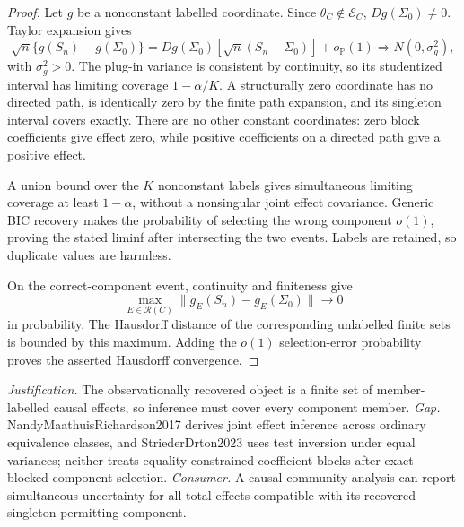 \documentclass{article}
\begin{document}
\begin{proof}
Let \(g\) be a nonconstant labelled coordinate.  Since \(\theta_C\notin\mathcal E_C\), \(Dg(\Sigma_0)\ne0\).  Taylor expansion gives
\[
 \sqrt n\{g(S_n)-g(\Sigma_0)\}
 =Dg(\Sigma_0)[\sqrt n(S_n-\Sigma_0)]+o_{\mathbb P}(1)
 \Longrightarrow N(0,\sigma_g^2),
\]
with \(\sigma_g^2>0\).  The plug-in variance is consistent by continuity, so its studentized interval has limiting coverage \(1-\alpha/K\).  A structurally zero coordinate has no directed path, is identically zero by the finite path expansion, and its singleton interval covers exactly.  There are no other constant coordinates: zero block coefficients give effect zero, while positive coefficients on a directed path give a positive effect.

A union bound over the \(K\) nonconstant labels gives simultaneous limiting coverage at least \(1-\alpha\), without a nonsingular joint effect covariance.  Generic BIC recovery makes the probability of selecting the wrong component \(o(1)\), proving the stated liminf after intersecting the two events.  Labels are retained, so duplicate values are harmless.

On the correct-component event, continuity and finiteness give
\[
 \max_{E\in\mathcal R(C)}\|g_E(S_n)-g_E(\Sigma_0)\|\longrightarrow0
\]
in probability.  The Hausdorff distance of the corresponding unlabelled finite sets is bounded by this maximum.  Adding the \(o(1)\) selection-error probability proves the asserted Hausdorff convergence.
\end{proof}
\par\smallskip\noindent \textit{Justification.} The observationally recovered object is a finite set of member-labelled causal effects, so inference must cover every component member. \textit{Gap.} NandyMaathuisRichardson2017 derives joint effect inference across ordinary equivalence classes, and StriederDrton2023 uses test inversion under equal variances; neither treats equality-constrained coefficient blocks after exact blocked-component selection. \textit{Consumer.} A causal-community analysis can report simultaneous uncertainty for all total effects compatible with its recovered singleton-permitting component.
\end{document}
